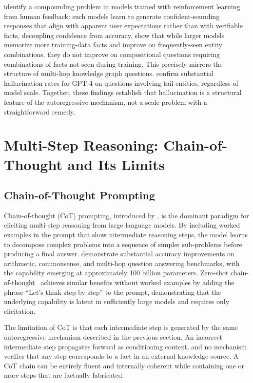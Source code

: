 \citet{perez2022sycophancy} identify a compounding problem in models trained with reinforcement learning from human feedback: such models learn to generate confident-sounding responses that align with apparent user expectations rather than with verifiable facts, decoupling confidence from accuracy. \citet{kandpal2023large} show that while larger models memorize more training-data facts and improve on frequently-seen entity combinations, they do not improve on compositional questions requiring combinations of facts not seen during training. This precisely mirrors the structure of multi-hop knowledge graph questions. \citet{mallen2023not} confirm substantial hallucination rates for GPT-4 on questions involving tail entities, regardless of model scale. Together, these findings establish that hallucination is a structural feature of the autoregressive mechanism, not a scale problem with a straightforward remedy.

\section{Multi-Step Reasoning: Chain-of-Thought and Its Limits}
\label{sec:cot}

\subsection{Chain-of-Thought Prompting}

Chain-of-thought (CoT) prompting, introduced by \citet{wei2022cot}, is the dominant paradigm for eliciting multi-step reasoning from large language models. By including worked examples in the prompt that show intermediate reasoning steps, the model learns to decompose complex problems into a sequence of simpler sub-problems before producing a final answer. \citet{wei2022cot} demonstrate substantial accuracy improvements on arithmetic, commonsense, and multi-hop question answering benchmarks, with the capability emerging at approximately 100 billion parameters. Zero-shot chain-of-thought~\citep{kojima2022zero} achieves similar benefits without worked examples by adding the phrase ``Let's think step by step'' to the prompt, demonstrating that the underlying capability is latent in sufficiently large models and requires only elicitation.

The limitation of CoT is that each intermediate step is generated by the same autoregressive mechanism described in the previous section. An incorrect intermediate step propagates forward as conditioning context, and no mechanism verifies that any step corresponds to a fact in an external knowledge source. A CoT chain can be entirely fluent and internally coherent while containing one or more steps that are factually fabricated.

